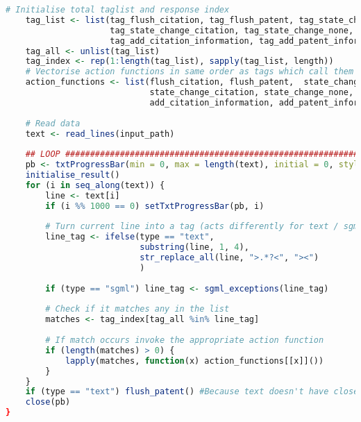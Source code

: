 \begin{lstlisting}[language=R]
    # Initialise total taglist and response index
    tag_list <- list(tag_flush_citation, tag_flush_patent, tag_state_change_patent, 
                     tag_state_change_citation, tag_state_change_none, tag_initialise_result,
                     tag_add_citation_information, tag_add_patent_information)
    tag_all <- unlist(tag_list)
    tag_index <- rep(1:length(tag_list), sapply(tag_list, length))
    # Vectorise action functions in same order as tags which call them
    action_functions <- list(flush_citation, flush_patent,  state_change_patent, 
                             state_change_citation, state_change_none, initialise_result,
                             add_citation_information, add_patent_information)
    
    # Read data
    text <- read_lines(input_path)
    
    ## LOOP ############################################################
    pb <- txtProgressBar(min = 0, max = length(text), initial = 0, style = 3)
    initialise_result()
    for (i in seq_along(text)) {
        line <- text[i]
        if (i %% 1000 == 0) setTxtProgressBar(pb, i)
        
        # Turn current line into a tag (acts differently for text / sgml)
        line_tag <- ifelse(type == "text", 
                           substring(line, 1, 4), 
                           str_replace_all(line, ">.*?<", "><")
                           )
        
        if (type == "sgml") line_tag <- sgml_exceptions(line_tag)
    
        # Check if it matches any in the list 
        matches <- tag_index[tag_all %in% line_tag]
        
        # If match occurs invoke the appropriate action function
        if (length(matches) > 0) {
            lapply(matches, function(x) action_functions[[x]]())
        }
    }
    if (type == "text") flush_patent() #Because text doesn't have close tags
    close(pb)
}

\end{lstlisting}

